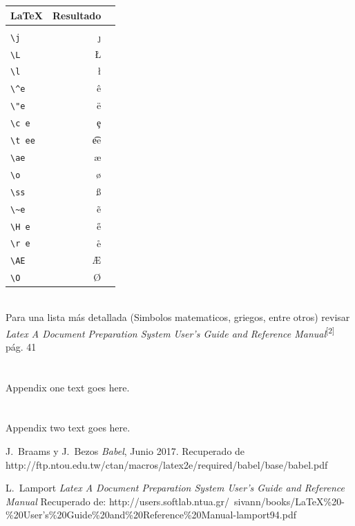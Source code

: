 \documentclass[10pt,journal,compsoc]{IEEEtran}
\begin{document}
	\begin{minipage}{0.1\textwidth}
		\begin{tabular}{ l r r }
			\LaTeX & Resultado \\
			\hline\\
			\verb|\j| & \j \\
			\verb|\L| & \L \\
			\verb|\l| & \l \\
			\verb|\^e| & \^e \\
			\verb|\"e| & \"e \\
			\verb|\c e| & \c e \\
			\verb|\t ee|& \t ee \\
			\verb|\ae| & \ae \\
			\verb|\o| & \o \\
			\verb|\ss| & \ss \\
			\verb|\~e| & \~e \\
			\verb|\H e| & \H e \\
			\verb|\r e| & \r e \\
			\verb|\AE| & \AE \\
			\verb|\O|& \O \\
		\end{tabular}
		\hfill
	\end{minipage}\\
	Para una lista m\'as detallada (Simbolos matematicos, griegos, entre otros) revisar \emph{Latex A Document Preparation System User's Guide and Reference Manual}\textsuperscript{[2]} p\'ag. 41
\appendices
\section{}
Appendix one text goes here.

\section{}
Appendix two text goes here.

\begin{thebibliography}{2}
	
	J.~Braams y J.~Bezos \emph{Babel}, Junio 2017. Recuperado de http://ftp.ntou.edu.tw/ctan/macros/latex2e/required/babel/base/babel.pdf  
	
	L.~Lamport \emph{Latex A Document Preparation System User's Guide and Reference Manual} Recuperado de:
	http://users.softlab.ntua.gr/~sivann/books/LaTeX\%20-\%20User's\%20Guide\%20and\%20Reference\%20Manual-lamport94.pdf
	
	
	
\end{thebibliography}
\end{document}
